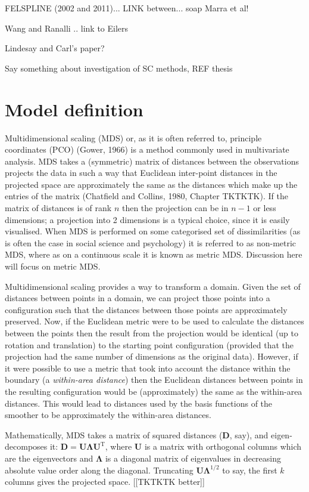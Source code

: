 \documentclass[useAMS,referee, usegraphicx]{biom}
\begin{document}
FELSPLINE (2002 and 2011)... LINK between... soap Marra et al!

Wang and Ranalli .. link to Eilers

Lindesay and Carl's paper?


Say something about investigation of SC methods, REF thesis

\section{Model definition}
\label{proposed-model}

Multidimensional scaling (MDS) or, as it is often referred to, principle coordinates (PCO) (Gower, 1966) is a method commonly used in multivariate analysis. MDS takes a (symmetric) matrix of distances between the observations projects the data in such a way that Euclidean inter-point distances in the projected space are approximately the same as the distances which make up the entries of the matrix (Chatfield and Collins, 1980, Chapter TKTKTK). If the matrix of distances is of rank $n$ then the projection can be in $n-1$ or less dimensions; a projection into 2 dimensions is a typical choice, since it is easily visualised. When MDS is performed on some categorised set of dissimilarities (as is often the case in social science and psychology) it is referred to as non-metric MDS, where as on a continuous scale it is known as metric MDS. Discussion here will focus on metric MDS.

Multidimensional scaling provides a way to transform a domain. Given the set of distances between points in a domain, we can project those points into a configuration such that the distances between those points are approximately preserved. Now, if the Euclidean metric were to be used to calculate the distances between the points then the result from the projection would be identical (up to rotation and translation) to the starting point configuration (provided that the projection had the same number of dimensions as the original data). However, if it were possible to use a metric that took into account the distance within the boundary (a \textit{within-area distance}) then the Euclidean distances between points in the resulting configuration would be (approximately) the same as the within-area distances. This would lead to distances used by the basis functions of the smoother to be approximately the within-area distances.

Mathematically, MDS takes a matrix of squared distances ($\mathbf{D}$, say), and eigen-decomposes it: $\mathbf{D}=\mathbf{U}\mathbf{\Lambda}\mathbf{U}^\text{T}$, where $\mathbf{U}$ is a matrix with orthogonal columns which are the eigenvectors and $\mathbf{\Lambda}$ is  a diagonal matrix of eigenvalues in decreasing absolute value order along the diagonal. Truncating $\mathbf{U}\mathbf{\Lambda}^{1/2}$ to say, the first $k$ columns gives the projected space. [[TKTKTK better]]
\end{document}
